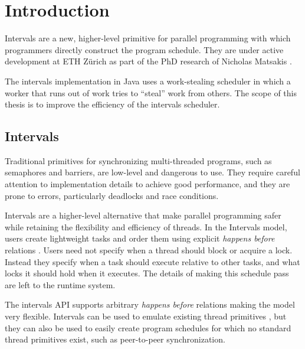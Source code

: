 
\chapter{Introduction}
\label{chap:introduction}

Intervals \cite{Matsakis2009b} are a new, higher-level primitive for
parallel programming with which programmers directly construct the
program schedule. They are under active development at ETH Zürich as
part of the PhD research of Nicholas Matsakis \cite{Matsakis2010}.

The intervals implementation in Java uses a work-stealing scheduler in
which a worker that runs out of work tries to ``steal'' work from
others. The scope of this thesis is to improve the efficiency of the
intervals scheduler.


\section{Intervals}
\label{sec:intro-intervals}

Traditional primitives for synchronizing multi-threaded programs, such
as semaphores and barriers, are low-level and dangerous to use. They
require careful attention to implementation details to achieve good
performance, and they are prone to errors, particularly deadlocks and
race conditions.

Intervals are a higher-level alternative that make parallel
programming safer while retaining the flexibility and efficiency of
threads. In the Intervals model, users create lightweight tasks and
order them using explicit \emph{happens before} relations
\cite{Lamport1978}. Users need not specify when a thread should block
or acquire a lock. Instead they specify when a task should execute
relative to other tasks, and what locks it should hold when it
executes. The details of making this schedule pass are left to the
runtime system.

The intervals API supports arbitrary \emph{happens before} relations
making the model very flexible. Intervals can be used to emulate
existing thread primitives \cite{Matsakis2009b}, but they can also be
used to easily create program schedules for which no standard thread
primitives exist, such as peer-to-peer synchronization.

